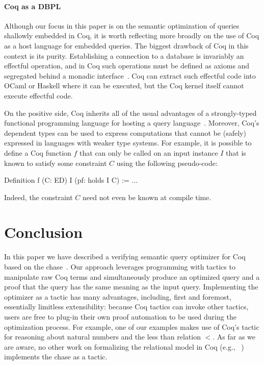 \documentclass{sigplanconf}
\begin{document}
\paragraph{Coq as a DBPL}

Although our focus in this paper is on the semantic optimization of queries shallowly embedded in Coq, it is worth reflecting more broadly on the use of Coq as a host language for embedded queries.  The biggest drawback of Coq in this context is its purity.  Establishing a connection to a database is invariably an effectful operation, and in Coq such operations must be defined as axioms and segregated behind a monadic interface~\cite{Malecha:2010:TVR:1706299.1706329}.  Coq can extract such effectful code into OCaml or Haskell where it can be executed, but the Coq kernel itself cannot execute effectful code.

On the positive side, Coq inherits all of the usual advantages of a strongly-typed functional programming language for hosting a query language~\cite{monad}.  Moreover, Coq's dependent types can be used to express computations that cannot be (safely) expressed in languages with weaker type systems.  For example, it is possible to define a Coq function $f$ that can only be called on an input instance $I$ that is known to satisfy some constraint $C$ using the following pseudo-code:
\begin{coq}
Definition f (C: ED) I (pf: holds I C) := ...
\end{coq}
Indeed, the constraint $C$ need not even be known at compile time.  

\section{Conclusion}
In this paper we have described a verifying semantic query optimizer for Coq based on the chase~\cite{Deutsch:2006:QRC:1121995.1122010}.  Our approach leverages programming with tactics to manipulate raw Coq terms and simultaneously produce an optimized query and a proof that the query has the same meaning as the input query.  Implementing the optimizer as a tactic has many advantages, including, first and foremost, essentially limitless extensibility: because Coq tactics can invoke other tactics, users are free to plug-in their own proof automation to be used during the optimization process.  For example, one of our examples makes use of Coq's  tactic for reasoning about natural numbers and the less than relation $<$.   As far as we are aware, no other work on formalizing the relational model in Coq (e.g., ~\cite{coqdb}) implements the chase as a tactic.
\end{document}
